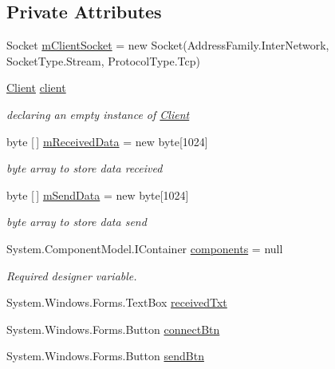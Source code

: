 \subsection*{Private Attributes}
\begin{DoxyCompactItemize}
\item 
Socket \hyperlink{class_socket_client_1_1_socket_client_a35ccb5352efed508548995ab83a319b7}{m\+Client\+Socket} = new Socket(Address\+Family.\+Inter\+Network, Socket\+Type.\+Stream, Protocol\+Type.\+Tcp)
\item 
\hyperlink{class_socket_client_1_1_client}{Client} \hyperlink{class_socket_client_1_1_socket_client_a09a6b075aa1a2e8669cf52466e28b988}{client}
\begin{DoxyCompactList}\small\item\em declaring an empty instance of \hyperlink{class_socket_client_1_1_client}{Client} \end{DoxyCompactList}\item 
byte \mbox{[}$\,$\mbox{]} \hyperlink{class_socket_client_1_1_socket_client_a0a354f927be0db166f1510a33cc0b13d}{m\+Received\+Data} = new byte\mbox{[}1024\mbox{]}
\begin{DoxyCompactList}\small\item\em byte array to store data received \end{DoxyCompactList}\item 
byte \mbox{[}$\,$\mbox{]} \hyperlink{class_socket_client_1_1_socket_client_aefa3c0bc58365462d700b01447b36d64}{m\+Send\+Data} = new byte\mbox{[}1024\mbox{]}
\begin{DoxyCompactList}\small\item\em byte array to store data send \end{DoxyCompactList}\item 
System.\+Component\+Model.\+I\+Container \hyperlink{class_socket_client_1_1_socket_client_a93c4c9bc725018e23eb8722ff5c5035c}{components} = null
\begin{DoxyCompactList}\small\item\em Required designer variable. \end{DoxyCompactList}\item 
System.\+Windows.\+Forms.\+Text\+Box \hyperlink{class_socket_client_1_1_socket_client_aa6e996e071df29e1290ab24dcc917831}{received\+Txt}
\item 
System.\+Windows.\+Forms.\+Button \hyperlink{class_socket_client_1_1_socket_client_a4189e5451a07ac6a6b7818910e005028}{connect\+Btn}
\item 
System.\+Windows.\+Forms.\+Button \hyperlink{class_socket_client_1_1_socket_client_ae39ef5159c71a2e983b6c19d3548622c}{send\+Btn}

\end{DoxyCompactItemize}
